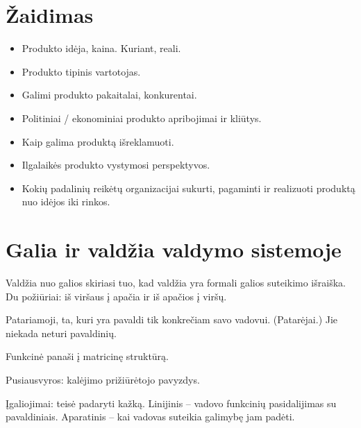 \chapter{Žaidimas}

\begin{itemize}
  \item Produkto idėja, kaina. Kuriant, reali.
  \item Produkto tipinis vartotojas.
  \item Galimi produkto pakaitalai, konkurentai.
  \item Politiniai / ekonominiai produkto apribojimai ir kliūtys.
  \item Kaip galima produktą išreklamuoti.
  \item Ilgalaikės produkto vystymosi perspektyvos.
  \item Kokių padalinių reikėtų organizacijai sukurti, pagaminti ir 
    realizuoti produktą nuo idėjos iki rinkos.
\end{itemize}

\chapter{Galia ir valdžia valdymo sistemoje}

Valdžia nuo galios skiriasi tuo, kad valdžia yra formali galios suteikimo
išraiška. Du požiūriai: iš viršaus į apačia ir iš apačios į viršų.

Patariamoji, ta, kuri yra pavaldi tik konkrečiam savo vadovui. 
(Patarėjai.) Jie niekada neturi pavaldinių.

Funkcinė panaši į matricinę struktūrą.



Pusiausvyros: kalėjimo prižiūrėtojo pavyzdys.


Įgaliojimai: teisė padaryti kažką. Linijinis – vadovo funkcinių 
pasidalijimas su pavaldiniais. Aparatinis – kai vadovas suteikia
galimybę jam padėti.



